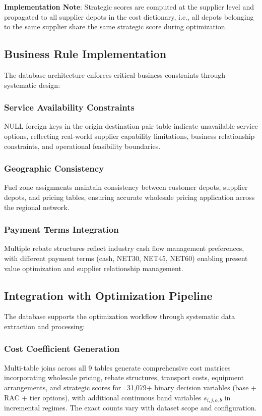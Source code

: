 \textbf{Implementation Note}: Strategic scores are computed at the supplier level and propagated to all supplier depots in the cost dictionary, i.e., all depots belonging to the same supplier share the same strategic score during optimization.

\subsection{Business Rule Implementation}
The database architecture enforces critical business constraints through systematic design:

\subsubsection{Service Availability Constraints}
NULL foreign keys in the origin-destination pair table indicate unavailable service options, reflecting real-world supplier capability limitations, business relationship constraints, and operational feasibility boundaries.

\subsubsection{Geographic Consistency}
Fuel zone assignments maintain consistency between customer depots, supplier depots, and pricing tables, ensuring accurate wholesale pricing application across the regional network.

\subsubsection{Payment Terms Integration}
Multiple rebate structures reflect industry cash flow management preferences, with different payment terms (cash, NET30, NET45, NET60) enabling present value optimization and supplier relationship management.

\subsection{Integration with Optimization Pipeline}
The database supports the optimization workflow through systematic data extraction and processing:

\subsubsection{Cost Coefficient Generation}
Multi-table joins across all 9 tables generate comprehensive cost matrices incorporating wholesale pricing, rebate structures, transport costs, equipment arrangements, and strategic scores for ~31,079+ binary decision variables (base + RAC + tier options), with additional continuous band variables $s_{i,j,o,b}$ in incremental regimes. The exact counts vary with dataset scope and configuration.

